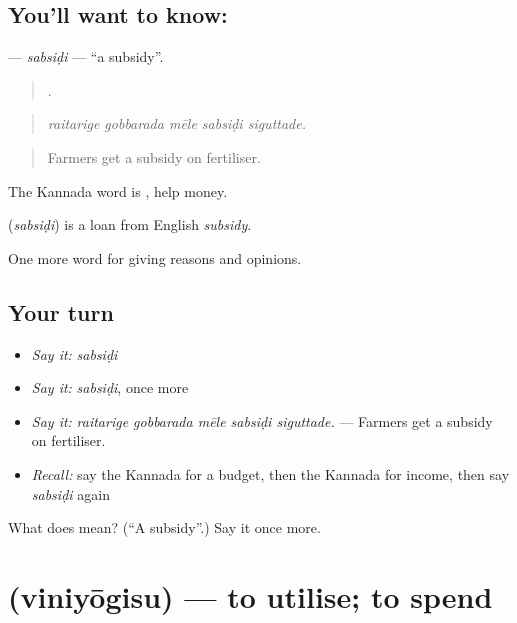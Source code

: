 \subsection*{You'll want to know: }
\textbf{} — \emph{sabsiḍi} — \textquotedblleft{}a subsidy\textquotedblright{}.

\begin{quote}
    .
\end{quote}

\begin{quote}
\emph{raitarige gobbarada mēle sabsiḍi siguttade.}
\end{quote}

\begin{quote}
Farmers get a subsidy on fertiliser.
\end{quote}

The Kannada word is , help money.

\begin{cousinweb}
\textbf{} (\emph{sabsiḍi}) is a loan from English \emph{subsidy}.
\end{cousinweb}

\begin{grammarlens}[title={What you've built}]
One more word for giving reasons and opinions.
\end{grammarlens}

\subsection*{Your turn}
\begin{itemize}
\raggedright
  \item \emph{Say it:} \emph{sabsiḍi}
  \item \emph{Say it:} \emph{sabsiḍi}, once more
  \item \emph{Say it:} \emph{raitarige gobbarada mēle sabsiḍi siguttade.} — Farmers get a subsidy on fertiliser.
  \item \emph{Recall:} say the Kannada for a budget, then the Kannada for income, then say \emph{sabsiḍi} again
\end{itemize}

\begin{tcolorbox}[breakable,colback=teal!4,colframe=teal!35!black,title={Before you move on}]
What does  mean? (\textquotedblleft{}A subsidy\textquotedblright{}.) Say it once more.
\end{tcolorbox}
\section[\texorpdfstring{\kn{ವಿನಿಯೋಗಿಸು} (viniyōgisu)}{ವಿನಿಯೋಗಿಸು (viniyōgisu)}]{ (viniyōgisu) — to utilise; to spend}

